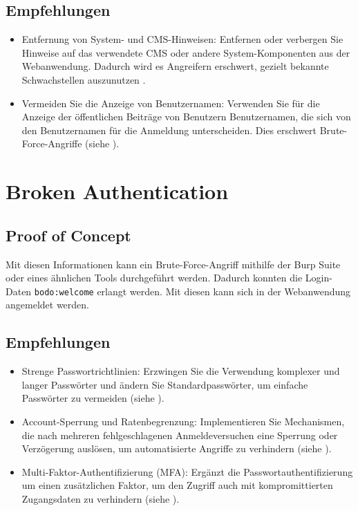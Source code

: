 \subsection*{Empfehlungen}
\begin{itemize}
    \item Entfernung von System- und CMS-Hinweisen: Entfernen oder verbergen Sie Hinweise auf das verwendete CMS oder andere System-Komponenten aus der Webanwendung. Dadurch wird es Angreifern erschwert, gezielt bekannte Schwachstellen auszunutzen .
    \item Vermeiden Sie die Anzeige von Benutzernamen: Verwenden Sie für die Anzeige der öffentlichen Beiträge von Benutzern Benutzernamen, die sich von den Benutzernamen für die Anmeldung unterscheiden. Dies erschwert Brute-Force-Angriffe (siehe \cite{owaspAuthenticationOWASP}).
\end{itemize}


\section{\makecvssbadge Broken Authentication}

\subsection*{Proof of Concept}
Mit diesen Informationen kann ein Brute-Force-Angriff mithilfe der Burp Suite oder eines ähnlichen Tools durchgeführt werden. Dadurch konnten die Login-Daten \texttt{bodo:welcome} erlangt werden. Mit diesen kann sich in der Webanwendung angemeldet werden.

\subsection*{Empfehlungen}
\begin{itemize}
    \item Strenge Passwortrichtlinien: Erzwingen Sie die Verwendung komplexer und langer Passwörter und ändern Sie Standardpasswörter, um einfache Passwörter zu vermeiden (siehe \cite{bsi_passwords}).
    \item Account-Sperrung und Ratenbegrenzung: Implementieren Sie Mechanismen, die nach mehreren fehlgeschlagenen Anmeldeversuchen eine Sperrung oder Verzögerung auslösen, um automatisierte Angriffe zu verhindern (siehe \cite{owaspAuthenticationOWASP}).
    \item Multi-Faktor-Authentifizierung (MFA): Ergänzt die Passwortauthentifizierung um einen zusätzlichen Faktor, um den Zugriff auch mit kompromittierten Zugangsdaten zu verhindern (siehe \cite{owaspAuthenticationOWASP}).
\end{itemize}

